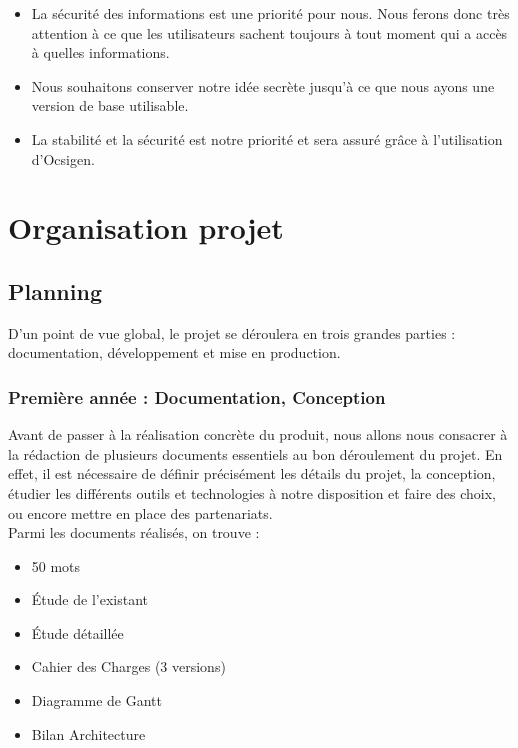 \documentclass{life-fr}
\begin{document}
\begin{itemize}
  \item La sécurité des informations est une priorité pour nous. Nous ferons donc très attention à ce que les utilisateurs sachent toujours à tout moment qui a accès à quelles informations.
  \item Nous souhaitons conserver notre idée secrète jusqu’à ce que nous ayons une version de base utilisable.
  \item La stabilité et la sécurité est notre priorité et sera assuré grâce à l'utilisation d'Ocsigen.
\end{itemize}


\chapter{Organisation projet}

\section{Planning}

D'un point de vue global, le projet se déroulera en trois grandes parties : documentation, développement et mise en production.\\

\subsection{ Première année : Documentation, Conception}

Avant de passer à la réalisation concrète du produit, nous allons nous consacrer à la rédaction de plusieurs documents essentiels au bon déroulement du projet. En effet, il est nécessaire de définir précisément les détails du projet, la conception, étudier les différents outils et technologies à notre disposition et faire des choix, ou encore mettre en place des partenariats.\\
Parmi les documents réalisés, on trouve :

\begin{itemize}
  \item 50 mots
  \item Étude de l'existant
  \item Étude détaillée
  \item Cahier des Charges (3 versions)
  \item Diagramme de Gantt
  \item Bilan Architecture
\end{itemize}
\end{document}
